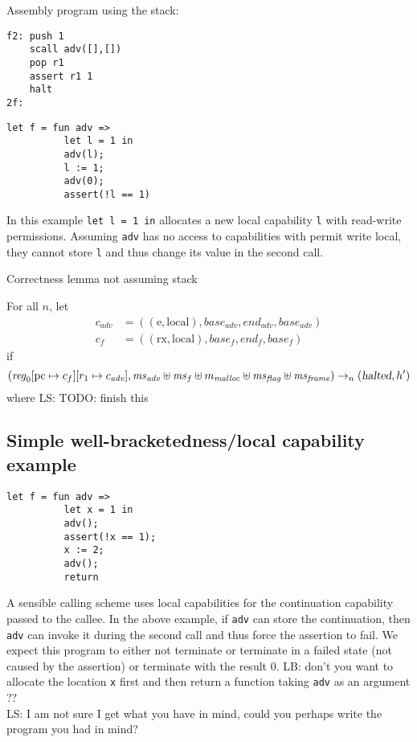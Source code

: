 \documentclass[a4paper]{article}
\newcommand{\update}[2]{[#1 \mapsto #2]}
\newcommand\lau[1]{{\color{purple} \sf \footnotesize {LS: #1}}\\}
\newcommand\lars[1]{{\color{purple} \sf \footnotesize {LB: #1}}\\}
\newcommand{\var}[1]{\mathit{#1}}
\newcommand{\hs}{\var{ms}}
\newcommand{\pcreg}{\mathrm{pc}}
\newcommand{\start}{\var{base}}
\newcommand{\addrend}{\var{end}}
\newcommand{\reg}{\var{reg}}
\newcommand{\adv}{\var{adv}}
\newcommand{\flag}{\var{flag}}
\newcommand{\halted}{\textsl{halted}}
\newcommand{\codelabel}[1]{\mathit{#1}}
\newcommand{\malloc}{\codelabel{malloc}}
\newcommand{\plainperm}[1]{\mathrm{#1}}
\newcommand{\exec}{\plainperm{rx}}
\newcommand{\entry}{\plainperm{e}}
\newcommand{\local}{\plainperm{local}}
\newcommand{\step}[1][]{\rightarrow_{#1}}
\begin{document}
Assembly program using the stack:
\begin{verbatim}
f2: push 1
    scall adv([],[])
    pop r1
    assert r1 1
    halt
2f:
\end{verbatim}

\begin{verbatim}
let f = fun adv =>
          let l = 1 in
          adv(l);
          l := 1;
          adv(0);
          assert(!l == 1)
\end{verbatim}
In this example \texttt{let l = 1 in} allocates a new local capability \texttt{l} with read-write permissions. Assuming \texttt{adv} has no access to capabilities with permit write local, they cannot store \texttt{l} and thus change its value in the second call.

Correctness lemma not assuming stack
\begin{lemma}
  For all $n$,
  let
  \begin{align*}
    c_\adv & = ((\entry,\local),\start_\adv,\addrend_\adv,\start_\adv) \\
    c_f & = ((\exec,\local),\start_f,\addrend_f,\start_f)
  \end{align*}
  if
  \[
    (\reg_0\update{\pcreg}{c_f}\update{r_1}{c_\adv},\hs_\adv \uplus \hs_f \uplus m_\malloc \uplus \hs_\flag \uplus \hs_{\var{frame}}) \step[n] (\halted, h')
  \]
  where
\lau{TODO: finish this}
\end{lemma}


\subsection{Simple well-bracketedness/local capability example}
\begin{verbatim}
let f = fun adv =>
          let x = 1 in
          adv();
          assert(!x == 1);
          x := 2;
          adv();
          return
\end{verbatim}
A sensible calling scheme uses local capabilities for the continuation capability passed to the callee. In the above example, if \texttt{adv} can store the continuation, then 
\texttt{adv} can invoke it during the second call and thus force the assertion to fail. We expect this program to either not terminate or terminate in a failed state (not caused by the assertion) or terminate with the result 0.
\lars{don't you want to allocate the location \texttt{x} first and then
  return a function taking \texttt{adv} as an argument ??}
\lau{I am not sure I get what you have in mind, could you perhaps write the program you had in mind?}
\end{document}
